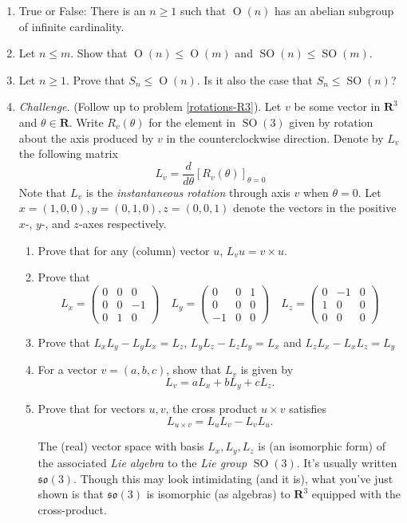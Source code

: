 \documentclass[12pt]{article}
\numberwithin{equation}{subsection}
\theoremstyle{note}
\newcommand{\Or}{\operatorname{O}}
\newcommand{\SO}{\operatorname{SO}}
\begin{document}
\begin{enumerate}[label=\arabic*.]
	\item True or False: There is an $n\geq 1$ such that  $\Or(n)$ has an abelian subgroup of infinite cardinality. 
	\item Let $n\leq m$. Show that $\Or(n)\leq \Or(m)$ and $\SO(n)\leq \SO(m)$.
	\item Let $n\geq 1$. Prove that $S_n\leq \Or(n)$. Is it also the case that $S_n\leq \SO(n)$?
	
	\item \textit{Challenge}. (Follow up to problem \ref{rotations-R3}). Let $v$ be some vector in $\mathbf{R}^3$ and $\theta\in \mathbf{R}$. Write  $R_v(\theta)$ for the element in $\SO(3)$ given by rotation about the axis produced by $v$ in the counterclockwise direction. Denote by $L_v$ the following matrix \[ L_v = \dfrac{d}{d\theta} \left[R_v(\theta) \right]_{\theta=0}\]
	Note that $L_v$ is the \textit{instantaneous rotation} through axis $v$ when $\theta=0$. 
	Let ${x}=(1,0,0), {y}=(0,1,0), {z}=(0,0,1)$ denote the vectors in the positive $x$-, $y$-, and $z$-axes respectively.
	\begin{enumerate}
	\item Prove that for any (column) vector $u$, $L_v u =v\times u$. 
	\item Prove that \[ L_x= \begin{pmatrix} 0 & 0 & 0 \\ 0 & 0 & -1 \\ 0 & 1 & 0\end{pmatrix} \quad L_y=\begin{pmatrix} 0 & 0 & 1 \\ 0 & 0 & 0 \\ -1 & 0 & 0 \end{pmatrix} \quad L_z=\begin{pmatrix} 0 & -1 & 0 \\ 1 & 0 & 0 \\ 0 & 0 & 0 \end{pmatrix}\]
	\item Prove that $L_x L_y-L_yL_x=L_z$, $L_yL_z-L_zL_y=L_x$ and $L_zL_x-L_xL_z=L_y$
	\item For a vector $v=(a,b,c)$, show that $L_v$ is given by  \[L_v=aL_x+bL_y+cL_z.\]
	\item Prove that for vectors $u,v$, the cross product $u\times v$ satisfies \[ L_{u\times v}=L_uL_v-L_vL_u.\]
	
	The (real) vector space with basis $L_x,L_y,L_z$ is (an isomorphic form) of the associated \textit{Lie algebra} to the \textit{Lie group} $\SO(3)$. It's usually written $\mathfrak{so}(3)$. Though this may look intimidating (and it is), what you've just shown is that $\mathfrak{so}(3)$ is isomorphic (as algebras) to $\mathbf{R}^3$ equipped with the cross-product.
	\end{enumerate}
	

\end{enumerate}
\end{document}

